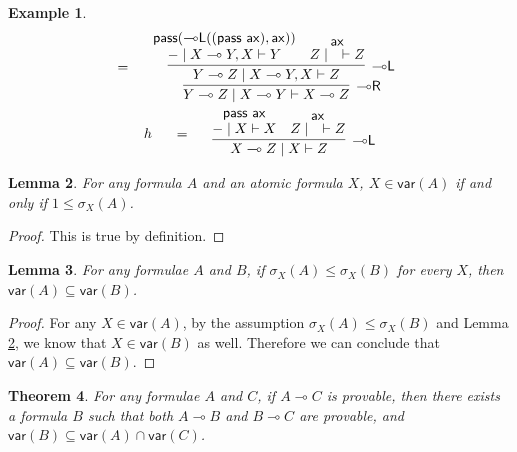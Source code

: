 \documentclass[sn-mathphys-num]{sn-jnl}%
\newcommand{\vd}{\vdash}
\newcommand{\pass}{\mathsf{pass}}
\newcommand{\ax}{\mathsf{ax}}
\newcommand{\lolli}{\multimap}
\newcommand{\lleft}{{\lolli}\mathsf{L}}
\newcommand{\lright}{{\lolli}\mathsf{R}}
\newcommand{\mf}[1]{\mathsf{#1}}
\newcommand{\gs}[1]{\sigma_{X} (#1)}
\newcommand{\vars}[1]{\mf{var} (#1)}
\theoremstyle{thmstyleone}%
\newtheorem{theorem}{Theorem}%
\theoremstyle{thmstyletwo}%
\newtheorem{example}[theorem]{Example}%
\newtheorem{lemma}[theorem]{Lemma}
\theoremstyle{thmstylethree}%
\begin{document}
\begin{example}
\begin{displaymath}
\begin{array}{c}
      =
      \quad
      \begin{array}{c}
        \infer[\lright]{Y \lolli Z \mid X \lolli Y \vd X \lolli Z}{
          \infer[\lleft]{Y \lolli Z \mid X \lolli Y , X \vd Z}{
            \deduce{{-} \mid X \lolli Y , X \vd Y}{\pass (\lleft ((\pass \ \ax), \ax))}
            &
            \deduce{Z \mid \quad \vd Z}{\ax}
          }
        }
      \end{array}
      \\[25pt]
      \begin{array}{c}
        h
      \end{array}
      \quad
      =
      \quad
      \begin{array}{c}
        \infer[\lleft]{X \lolli Z \mid X \vd Z}{
          \deduce{{-} \mid X \vd X}{\pass \ \ax}
          &
          \deduce{Z \mid \quad \vd Z}{\ax}
        }
      \end{array}
    \end{array}
  \end{displaymath}
\end{example}
\begin{lemma}\label{lem:gs:vars:equiv}
  For any formula $A$ and an atomic formula $X$, $X \in \vars{A}$ if and only if $1 \leq \gs{A}$.
\end{lemma}
\begin{proof}
  This is true by definition.
\end{proof}
\begin{lemma}\label{lem:gs2vars}
  For any formulae $A$ and $B$, if $\gs{A} \leq \gs{B}$ for every $X$, then $\vars{A} \subseteq \vars{B}$.
\end{lemma}
\begin{proof}
  For any $X \in \vars{A}$, by the assumption $\gs{A} \leq \gs{B}$ and Lemma \ref{lem:gs:vars:equiv}, we know that $X \in \vars{B}$ as well.
  Therefore we can conclude that $\vars{A} \subseteq \vars{B}$.
\end{proof}
\begin{theorem}\label{thm:craig:intrp}
  For any formulae $A$ and $C$, if $A \lolli C$ is provable, then there exists a formula $B$ such that both $A \lolli B$ and $B \lolli C$ are provable, and $\vars{B} \subseteq \vars{A} \cap \vars{C}$.
\end{theorem}
\end{document}
